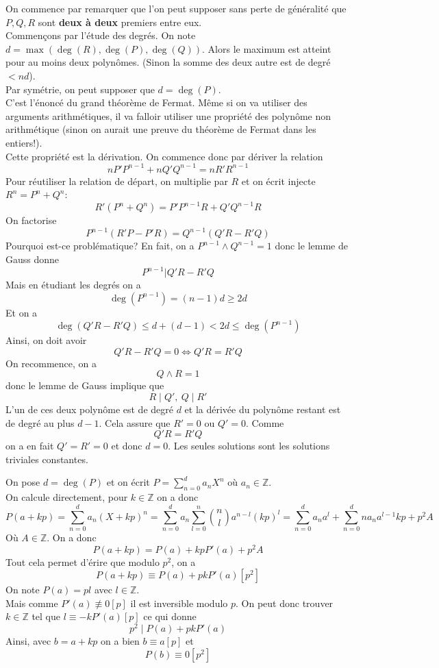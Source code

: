 \begin{sol}
On commence par remarquer que l'on peut supposer sans perte de généralité que $P,Q,R$ sont \textbf{deux à deux} premiers entre eux.
\\
Commençons par l'étude des degrés. On note $d=\max (\deg(R),\deg(P),\deg(Q))$. Alors le maximum est atteint pour au moins deux polynômes. (Sinon la somme des deux autre est de degré $<nd$).
\\
Par symétrie, on peut supposer que $d=\deg(P)$.
\\
C'est l'énoncé du grand théorème de Fermat. Même si on va utiliser des arguments arithmétiques, il va falloir utiliser une propriété des polynôme non arithmétique (sinon on aurait une preuve du théorème de Fermat dans les entiers!).
\\
Cette propriété est la dérivation. On commence donc par dériver la relation
$$nP'P^{n-1}+nQ'Q^{n-1}=nR'R^{n-1} $$
Pour réutiliser la relation de départ, on multiplie par $R$ et on écrit injecte $R^n=P^n+Q^n$:
$$R'(P^n+Q^n)=P'P^{n-1}R+Q'Q^{n-1}R $$
On factorise 
$$P^{n-1}(R'P-P'R)=Q^{n-1}(Q'R-R'Q) $$
Pourquoi est-ce problématique? En fait, on a $P^{n-1}\wedge Q^{n-1}=1$ donc le lemme de Gauss donne 
$$P^{n-1}|Q'R-R'Q $$
Mais en étudiant les degrés on a 
$$\deg(P^{n-1})=(n-1)d\geq 2d $$
Et on a
$$ \deg(Q'R-R'Q)\leq d+(d-1)<2d\leq \deg(P^{n-1})$$
Ainsi, on doit avoir 
$$Q'R-R'Q=0\iff Q'R=R'Q $$
On recommence, on a 
$$Q\wedge R=1 $$ donc le lemme de Gauss implique que 
$$R\mid Q', \: Q\mid R' $$
L'un de ces deux polynôme est de degré $d$ et la dérivée du polynôme restant est de degré au plus $d-1$. Cela assure que $R'=0$ ou $Q'=0$. Comme 
$$Q'R=R'Q $$ on a en fait $Q'=R'=0$ et donc $d=0$. Les seules solutions sont les solutions triviales constantes.
\end{sol}


\begin{sol}
On pose $d=\deg(P)$ et on écrit $P=\sum_{n=0}^da_nX^n$ où $a_n\in \mathbb{Z}$.
\\
On calcule directement, pour $k\in \mathbb{Z}$ on a donc 
$$P(a+kp)=\sum_{n=0}^da_n(X+kp)^n=\sum_{n=0}^da_n\sum_{l=0}^n\binom{n}{l}a^{n-l}(kp)^l =\sum_{n=0}^da_na^l+\sum_{n=0}^dna_na^{l-1}kp+p^2A$$
Où $A\in \mathbb{Z}$. On a donc 
$$P(a+kp)=P(a)+kpP'(a)+p^2A $$
Tout cela permet d'érire que modulo $p^2$, on a 
$$P(a+kp)\equiv P(a)+pkP'(a)[p^2] $$
On note $P(a)=pl$ avec $l\in \mathbb{Z}$.
\\
Mais comme $P'(a)\not\equiv 0[p]$ il est inversible modulo $p$. On peut donc trouver $k\in \mathbb{Z}$ tel que $l\equiv -kP'(a)[p]$ ce qui donne 
$$p^2\mid P(a)+pkP'(a) $$
Ainsi, avec $b=a+kp$ on a bien $b\equiv a[p]$ et 
$$P(b)\equiv 0[p^2] $$
\end{sol}

